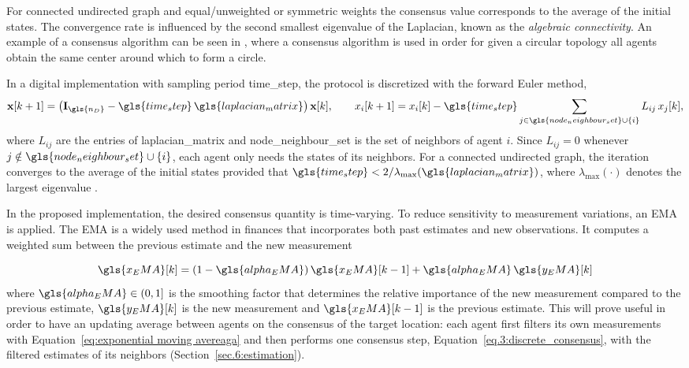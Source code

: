 For connected undirected graph and equal/unweighted or symmetric weights the consensus value corresponds to the average of the initial states.
The convergence rate is influenced by the second smallest eigenvalue of the Laplacian, known as the \textit{algebraic connectivity}. An example of a consensus algorithm can be seen in \cite{Jin2018}, where a consensus algorithm is used in order for given a circular topology all agents obtain the same center around which to form a circle. 

In a digital implementation with sampling period \gls{time_step}, the protocol is discretized with the forward Euler method,
\begin{equation}
    \mathbf{x}[k+1] = \left(\mathbf{I}_{\gls{n_D}} - \gls{time_step}\,\gls{laplacian_matrix}\right)\mathbf{x}[k],
    \qquad
    x_i[k+1] = x_i[k] - \gls{time_step}\sum_{j\in\gls{node_neighbour_set}\cup\{i\}} L_{ij}\,x_j[k],
    \label{eq.3:discrete_consensus}
\end{equation}
where $L_{ij}$ are the entries of \gls{laplacian_matrix} and \gls{node_neighbour_set} is the set of neighbors of agent $i$. Since $L_{ij}=0$ whenever $j\notin\gls{node_neighbour_set}\cup\{i\}$, each agent only needs the states of its neighbors. For a connected undirected graph, the iteration converges to the average of the initial states provided that $\gls{time_step}<2/\lambda_{\max}(\gls{laplacian_matrix})$, where $\lambda_{\max}(\cdot)$ denotes the largest eigenvalue \cite{olfati-saberConsensusCooperationNetworked2007}.

In the proposed implementation, the desired consensus quantity is time-varying. To reduce sensitivity to measurement variations, an \gls{EMA} is applied. The \gls{EMA} is a widely used method in finances \cite{88532096-312a-3df5-a4f1-b38133fb2ba4} that incorporates both past estimates and new observations. It computes a weighted sum between the previous estimate and the new measurement

\begin{equation}
    \gls{x_EMA}[k] = (1 - \gls{alpha_EMA})\, \gls{x_EMA}[k-1] + \gls{alpha_EMA}\, \gls{y_EMA}[k]
    \label{eq:exponential moving avereaga}
\end{equation}
where $\gls{alpha_EMA} \in (0,1]$ is the smoothing factor that determines the relative importance of the new measurement compared to the previous estimate, $\gls{y_EMA}[k]$ is the new measurement and $\gls{x_EMA}[k-1]$ is the previous estimate. This will prove useful in order to have an updating average between agents on the consensus of the target location: each agent first filters its own measurements with Equation~\eqref{eq:exponential moving avereaga} and then performs one consensus step, Equation~\eqref{eq.3:discrete_consensus}, with the filtered estimates of its neighbors (Section~\ref{sec.6:estimation}).

